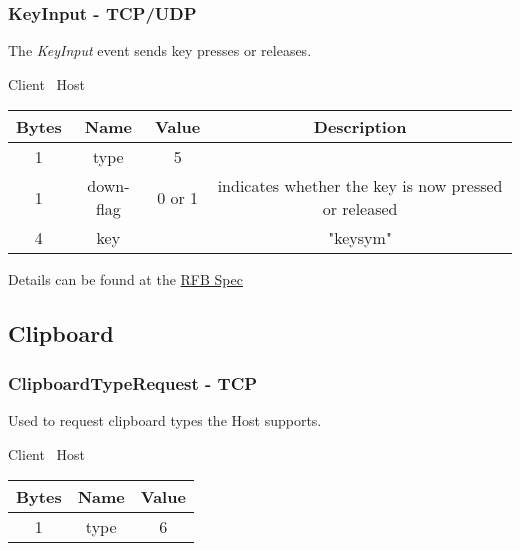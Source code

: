 \documentclass{article}
\begin{document}
    \subsubsection{KeyInput - TCP/UDP}

    The \emph{KeyInput} event sends key presses or releases.

    \begin{center}
        Client \textrightarrow\ Host\\
        \begin{tabular}{|c|c|c|c|}
            \hline
            \textbf{Bytes} & \textbf{Name} & \textbf{Value} & \textbf{Description}                                 \\
            \hline
            1              & type          & 5              &                                                      \\
            \hline
            1              & down-flag     & 0 or 1         & indicates whether the key is now pressed or released \\
            \hline
            4              & key           &                & "keysym"                                             \\
            \hline
        \end{tabular}
    \end{center}

    Details can be found at the \href{https://github.com/rfbproto/rfbproto/blob/master/rfbproto.rst#keyevent}{RFB Spec}

    \subsection{Clipboard} %

    \subsubsection{ClipboardTypeRequest - TCP}

    Used to request clipboard types the Host supports.

    \begin{center}
        Client \textrightarrow\ Host\\
        \begin{tabular}{|c|c|c|}
            \hline
            \textbf{Bytes} & \textbf{Name} & \textbf{Value} \\
            \hline
            1              & type          & 6              \\
            \hline
        \end{tabular}
    \end{center}
\end{document}
